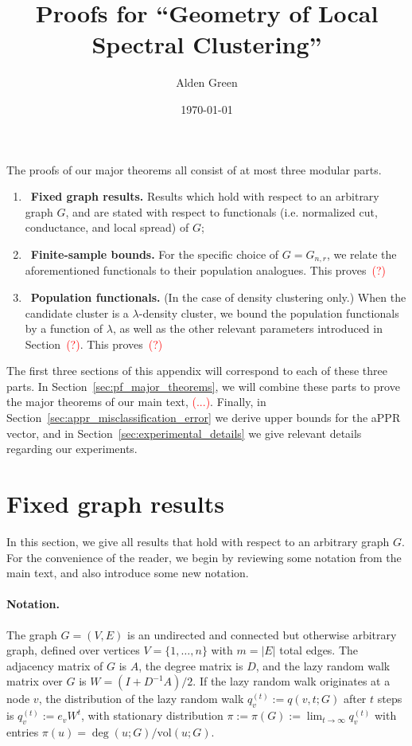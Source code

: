 \documentclass{article}
\newcommand{\vol}{\mathrm{vol}}
\newcommand{\1}{\mathbf{1}}
\theoremstyle{definition}
\theoremstyle{remark}
\begin{document}
\title{Proofs for ``Geometry of Local Spectral Clustering''}
\author{Alden Green}
\date{\today}
\maketitle

The proofs of our major theorems all consist of at most three modular parts.
\begin{enumerate}
	\item~\textbf{Fixed graph results.} Results which hold with respect to an arbitrary graph $G$, and are stated with respect to functionals (i.e. normalized cut, conductance, and local spread) of $G$;
	\item~\textbf{Finite-sample bounds.} For the specific choice of $G = G_{n,r}$, we relate the aforementioned functionals to their population analogues. This proves~\textcolor{red}{(?)} 
	\item~\textbf{Population functionals.} (In the case of density clustering only.) When the candidate cluster is a $\lambda$-density cluster, we bound the population functionals by a function of $\lambda$, as well as the other relevant parameters introduced in Section~\textcolor{red}{(?)}. This proves~\textcolor{red}{(?)}
\end{enumerate}
The first three sections of this appendix will correspond to each of these three parts. In Section~\ref{sec:pf_major_theorems}, we will combine these parts to prove the major theorems of our main text, \textcolor{red}{(...)}. Finally, in Section~\ref{sec:appr_misclassification_error} we derive upper bounds for the aPPR vector, and in Section~\ref{sec:experimental_details} we give relevant details regarding our experiments.

\section{Fixed graph results}
In this section, we give all results that hold with respect to an arbitrary graph $G$. For the convenience of the reader, we begin by reviewing some notation from the main text, and also introduce some new notation. 

\paragraph{Notation.}
The graph $G = (V,E)$ is an undirected and connected but otherwise arbitrary graph, defined over vertices $V = \{1,\ldots,n\}$ with $m = |E|$ total edges. The adjacency matrix of $G$ is $A$, the degree matrix is $D$, and the lazy random walk matrix over $G$ is $W = (I + D^{-1}A)/2$. If the lazy random walk originates at a node $v$, the distribution of the lazy random walk $q_v^{(t)} := q(v,t;G)$ after $t$ steps is $q_v^{(t)} := e_v W^t$, with stationary distribution $\pi := \pi(G) := \lim_{t \to \infty} q_v^{(t)}$ with entries $\pi(u) = \deg(u;G)/\vol(u;G)$.
\end{document}
